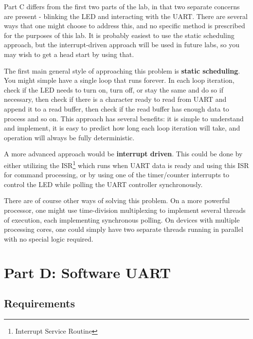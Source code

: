 \documentclass{article}
\begin{document}
Part C differs from the first two parts of the lab, in that two separate
concerns are present - blinking the LED and interacting with the UART. There
are several ways that one might choose to address this, and no specific method
is prescribed for the purposes of this lab. It is probably easiest to use the
static scheduling approach, but the interrupt-driven approach will be used in
future labs, so you may wish to get a head start by using that.

The first main general style of approaching this problem is \textbf{static
scheduling}. You might simple have a single loop that runs forever. In each
loop iteration, check if the LED needs to turn on, turn off, or stay the same
and do so if necessary, then check if there is a character ready to read from
UART and append it to a read buffer, then check if the read buffer has enough
data to process and so on. This approach has several benefits: it is simple to
understand and implement, it is easy to predict how long each loop iteration
will take, and operation will always be fully deterministic.

A more advanced approach would be \textbf{interrupt driven}. This could be done
by either utilizing the ISR\footnote{Interrupt Service Routine} which runs when
UART data is ready and using this ISR for command processing, or by using one
of the timer/counter interrupts to control the LED while polling the UART
controller synchronously.

There are of course other ways of solving this problem. On a more powerful
processor, one might use time-division multiplexing to implement several
threads of execution, each implementing synchronous polling. On devices with
multiple processing cores, one could simply have two separate threads running
in parallel with no special logic required.

\section{Part D: Software UART}

\subsection{Requirements}
\end{document}
